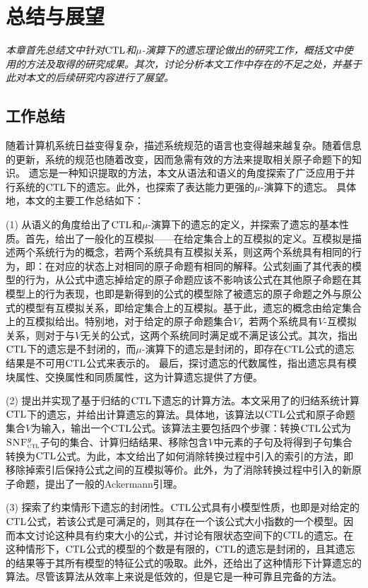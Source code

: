 \chapter{总结与展望}\label{chapter09}
{\em 本章首先总结文中针对$\textrm{CTL}$和$\mu$-演算下的遗忘理论做出的研究工作，概括文中使用的方法及取得的研究成果。其次，讨论分析本文工作中存在的不足之处，并基于此对本文的后续研究内容进行了展望。}

\section{工作总结}
随着计算机系统日益变得复杂，描述系统规范的语言也变得越来越复杂。随着信息的更新，系统的规范也随着改变，因而急需有效的方法来提取相关原子命题下的知识。
遗忘是一种知识提取的方法，本文从语法和语义的角度探索了广泛应用于并行系统的$\textrm{CTL}$下的遗忘。此外，也探索了表达能力更强的$\mu$-演算下的遗忘。
具体地，本文的主要工作总结如下：

(1) 从语义的角度给出了$\textrm{CTL}$和$\mu$-演算下的遗忘的定义，并探索了遗忘的基本性质。首先，给出了一般化的互模拟——在给定集合上的互模拟的定义。互模拟是描述两个系统行为的概念，若两个系统具有互模拟关系，则这两个系统具有相同的行为，即：在对应的状态上对相同的原子命题有相同的解释。公式刻画了其代表的模型的行为，从公式中遗忘掉给定的原子命题应该不影响该公式在其他原子命题在其模型上的行为表现，也即是新得到的公式的模型除了被遗忘的原子命题之外与原公式的模型有互模拟关系，即给定集合上的互模拟。基于此，遗忘的概念由给定集合上的互模拟给出。特别地，对于给定的原子命题集合$V$，若两个系统具有$V$-互模拟关系，则对于与$V$无关的公式，这两个系统同时满足或不满足该公式。其次，指出$\textrm{CTL}$下的遗忘是不封闭的，而$\mu$-演算下的遗忘是封闭的，即存在$\textrm{CTL}$公式的遗忘结果是不可用$\textrm{CTL}$公式来表示的。
最后，探讨遗忘的代数属性，指出遗忘具有模块属性、交换属性和同质属性，这为计算遗忘提供了方便。

(2) 提出并实现了基于归结的$\textrm{CTL}$下遗忘的计算方法。本文采用了\citeauthor{zhang2014resolution}的归结系统计算$\textrm{CTL}$下的遗忘，并给出计算遗忘的算法。具体地，该算法以$\textrm{CTL}$公式和原子命题集合$V$为输入，输出一个$\textrm{CTL}$公式。该算法主要包括四个步骤：转换$\textrm{CTL}$公式为${\textsc{SNF}_{\textsc{ctl}}^g}$子句的集合、计算归结结果、移除包含$V$中元素的子句及将得到子句集合转换为$\textrm{CTL}$公式。为此，本文给出了如何消除转换过程中引入的索引的方法，即移除掉索引后保持公式之间的互模拟等价。此外，为了消除转换过程中引入的新原子命题，提出了一般的Ackermann引理。

(3) 探索了约束情形下遗忘的封闭性。$\textrm{CTL}$公式具有小模型性质，也即是对给定的$\textrm{CTL}$公式，若该公式是可满足的，则其存在一个该公式大小指数的一个模型。因而本文讨论这种具有约束大小的公式，并讨论有限状态空间下的$\textrm{CTL}$的遗忘。在这种情形下，$\textrm{CTL}$公式的模型的个数是有限的，$\textrm{CTL}$的遗忘是封闭的，且其遗忘的结果等于其所有模型的特征公式的吸取。此外，还给出了这种情形下计算遗忘的算法。尽管该算法从效率上来说是低效的，但是它是一种可靠且完备的方法。

